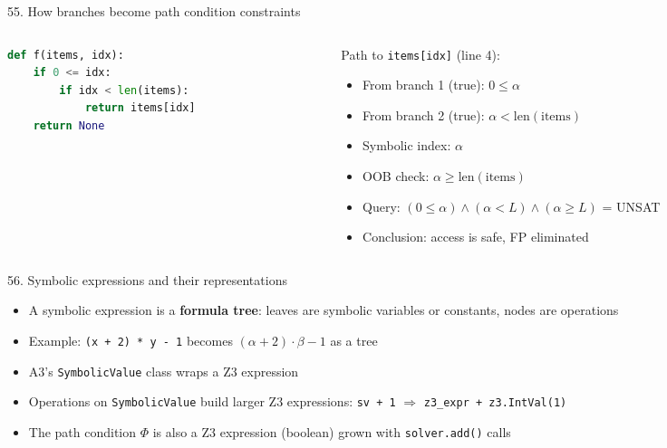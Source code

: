 \documentclass[aspectratio=169]{beamer}
\begin{document}
\begin{frame}[fragile]{55. How branches become path condition constraints}
\begin{columns}
\begin{column}{0.45\textwidth}
\begin{lstlisting}[language=Python]
def f(items, idx):
    if 0 <= idx:
        if idx < len(items):
            return items[idx]
    return None
\end{lstlisting}
\end{column}
\begin{column}{0.52\textwidth}
Path to \texttt{items[idx]} (line 4):
\begin{itemize}
  \item From branch 1 (true): \(0 \le \alpha\)
  \item From branch 2 (true): \(\alpha < \text{len}(\text{items})\)
  \item Symbolic index: \(\alpha\)
  \item OOB check: \(\alpha \ge \text{len}(\text{items})\)
  \item Query: \((0 \le \alpha) \wedge (\alpha < L) \wedge (\alpha \ge L)\) = UNSAT
  \item Conclusion: access is safe, FP eliminated
\end{itemize}
\end{column}
\end{columns}
\end{frame}

\begin{frame}{56. Symbolic expressions and their representations}
\begin{itemize}
  \item A symbolic expression is a \textbf{formula tree}: leaves are symbolic variables or constants, nodes are operations
  \item Example: \texttt{(x + 2) * y - 1} becomes \((\alpha + 2) \cdot \beta - 1\) as a tree
  \item A3's \texttt{SymbolicValue} class wraps a Z3 expression
  \item Operations on \texttt{SymbolicValue} build larger Z3 expressions: \texttt{sv + 1} $\Rightarrow$ \texttt{z3\_expr + z3.IntVal(1)}
  \item The path condition \(\Phi\) is also a Z3 expression (boolean) grown with \texttt{solver.add()} calls
\end{itemize}
\end{frame}
\end{document}
